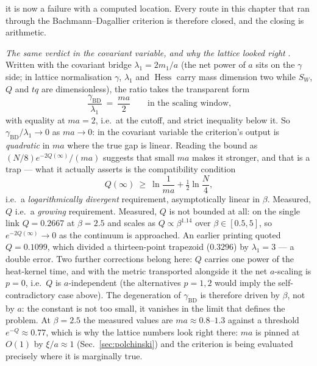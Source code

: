 it is now a failure with a computed location. Every route in this chapter that ran through the
Bachmann--Dagallier criterion is therefore closed, and the closing is arithmetic.

\emph{The same verdict in the covariant variable, and why the lattice looked right} \LE. Written with
the covariant bridge $\lambda_1=2m_1/a$ (the net power of $a$ sits on the $\gamma$ side; in lattice
normalisation $\gamma$, $\lambda_1$ and $\operatorname{Hess}$ carry mass dimension two while $S_W$,
$Q$ and $tq$ are dimensionless), the ratio takes the transparent form
\begin{equation}
\frac{\gamma_{\mathrm{BD}}}{\lambda_1}\ =\ \frac{m a}{2}\qquad\text{in the scaling window,}
\label{eq:bd-ratio-cov}
\end{equation}
with equality at $m a=2$, i.e.\ at the cutoff, and strict inequality below it. So
$\gamma_{\mathrm{BD}}/\lambda_1\to0$ as $ma\to0$: in the covariant variable the criterion's output is
\emph{quadratic} in $ma$ where the true gap is linear. Reading the bound as
$(N/8)e^{-2Q(\infty)}/(ma)$ suggests that small $ma$ makes it stronger, and that is a trap --- what it
actually asserts is the compatibility condition
\begin{equation}
Q(\infty)\ \ge\ \ln\frac{1}{ma}+\tfrac12\ln\frac N4 ,
\label{eq:Q-required}
\end{equation}
i.e.\ a \emph{logarithmically divergent} requirement, asymptotically linear in $\beta$. Measured, $Q$
i.e.\ a \emph{growing} requirement. Measured, $Q$ is not bounded at all: on the single link
$Q=0.2667$ at $\beta=2.5$ and scales as $Q\propto\beta^{1.14}$ over $\beta\in[0.5,5]$, so
$e^{-2Q(\infty)}\to0$ as the continuum is approached. An earlier printing quoted $Q=0.1099$, which
divided a thirteen-point trapezoid ($0.3296$) by $\lambda_1=3$ --- a double error. Two further
corrections belong here: $Q$ carries one power of the heat-kernel time, and with the metric
transported alongside it the net $a$-scaling is $p=0$, i.e.\ $Q$ is $a$-independent (the alternatives
$p=1,2$ would imply the self-contradictory case above). The degeneration of $\gamma_{\mathrm{BD}}$ is
therefore driven by $\beta$, not by $a$: the constant is not too small, it vanishes in the limit that
defines the problem. At $\beta=2.5$ the measured values are $ma\approx0.8$--$1.3$ against a threshold
$e^{-Q}\approx0.77$, which is why the lattice numbers look right there: $ma$ is pinned at $O(1)$ by
$\xi/a\approx1$ (Sec.~\ref{sec:polchinski}) and the criterion is being evaluated precisely where it is
marginally true.
